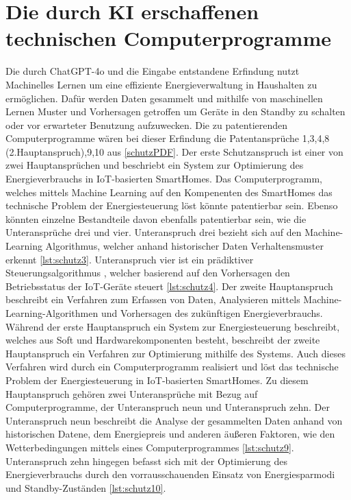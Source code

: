 \section{Die durch KI erschaffenen technischen Computerprogramme}
Die durch ChatGPT-4o und die Eingabe entstandene Erfindung nutzt Machinelles Lernen um eine effiziente
Energieverwaltung in Haushalten zu ermöglichen. 
Dafür werden Daten gesammelt und mithilfe von maschinellen Lernen Muster 
und Vorhersagen getroffen um Geräte in den Standby zu schalten 
oder vor erwarteter Benutzung aufzuwecken. 
Die zu patentierenden Computerprogramme wären bei dieser Erfindung die
Patentansprüche 1,3,4,8 (2.Hauptanspruch),9,10 aus \ref{schutzPDF}. 
Der erste Schutzanspruch ist einer von zwei Hauptansprüchen 
und beschriebt ein System zur Optimierung des Energieverbrauchs in IoT-basierten SmartHomes.
Das Computerprogramm, welches mittels Machine Learning
auf den Kompenenten des SmartHomes das technische Problem
der Energiesteuerung löst könnte patentierbar sein.
Ebenso könnten einzelne Bestandteile davon ebenfalls patentierbar sein,
wie die Unteransprüche drei und vier.
Unteranspruch drei bezieht sich auf den Machine-Learning Algorithmus,
welcher anhand historischer Daten Verhaltensmuster erkennt \ref{lst:schutz3}. 
Unteranspruch vier ist ein prädiktiver Steuerungsalgorithmus ,
welcher basierend auf den Vorhersagen 
den Betriebsstatus der IoT-Geräte steuert \ref{lst:schutz4}.
Der zweite Hauptanspruch beschreibt ein Verfahren zum Erfassen von Daten, 
Analysieren mittels Machine-Learning-Algorithmen 
und Vorhersagen des zukünftigen Energieverbrauchs. 
Während der erste Hauptanspruch ein System zur
Energiesteuerung beschreibt, welches aus 
Soft und Hardwarekomponenten besteht, 
beschreibt der zweite Hauptanspruch ein Verfahren zur Optimierung 
mithilfe des Systems. Auch dieses Verfahren wird durch ein 
Computerprogramm realisiert und löst das technische Problem 
der Energiesteuerung in IoT-basierten SmartHomes.
Zu diesem Hauptanspruch gehören zwei Unteransprüche mit Bezug auf 
Computerprogramme, der Unteranspruch neun und Unteranspruch zehn.
Der Unteranspruch neun beschreibt die Analyse der gesammelten
Daten anhand von historischen Datene, dem Energiepreis 
und anderen äußeren Faktoren, wie den Wetterbedingungen mittels
eines Computerprogrammes \ref{lst:schutz9}. 
Unteranspruch zehn hingegen befasst sich mit der Optimierung 
des Energieverbrauchs durch den vorrausschauenden 
Einsatz von Energiesparmodi und Standby-Zuständen \ref{lst:schutz10}.


